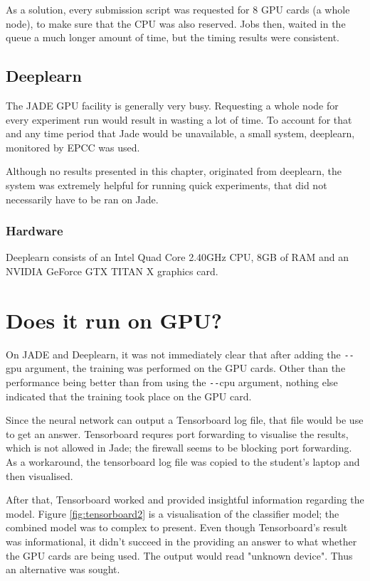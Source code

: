         As a solution, every submission script was requested for 8 GPU cards (a whole node), to make sure that the CPU was also reserved. Jobs then, waited in the queue a much longer amount of time, but the timing results were consistent. 
        
    \subsection{Deeplearn}
    The JADE GPU facility is generally very busy. Requesting a whole node for every experiment run would result in wasting a lot of time. To account for that and any time period that Jade would be unavailable, a small system, deeplearn, monitored by EPCC was used. 
    
    Although no results presented in this chapter, originated from deeplearn, the system was extremely helpful for running quick experiments, that did not necessarily have to be ran on Jade. 

    \subsubsection{Hardware}
        Deeplearn consists of an Intel Quad Core 2.40GHz CPU, 8GB of RAM and an NVIDIA GeForce GTX TITAN X graphics card.
        
\section{Does it run on GPU?}
On JADE and Deeplearn, it was not immediately clear that after adding the \verb|--|gpu argument, the training was performed on the GPU cards. Other than the performance being better than from using the \verb|--|cpu argument, nothing else indicated that the training took place on the GPU card.

Since the neural network can output a Tensorboard log file, that file would be use to get an answer. Tensorboard requres port forwarding to visualise the results, which is not allowed in Jade; the firewall seems to be blocking port forwarding. As a workaround, the tensorboard log file was copied to the student's laptop and then visualised. 

After that, Tensorboard worked and provided insightful information regarding the model. Figure \ref{fig:tensorboard2} is a visualisation of the classifier model; the combined model was to complex to present. Even though Tensorboard's result was informational, it didn't succeed in the providing an answer to what whether the GPU cards are being used. The output would read "unknown device". Thus an alternative was sought.

